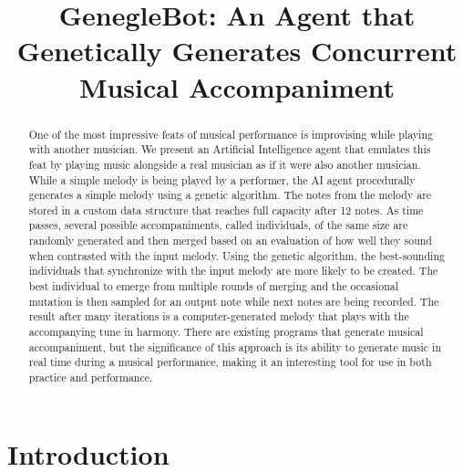 \documentclass[conference]{IEEEtran}
\begin{document}
\title{GenegleBot: An Agent that Genetically Generates Concurrent Musical Accompaniment
	\\
	{\footnotesize }
}

\author{
	\and
}

\maketitle

\begin{abstract}
	One of the most impressive feats of musical performance is improvising while playing with another musician. We present an Artificial Intelligence agent that emulates this feat by playing music alongside a real musician as if it were also another musician.
	While a simple melody is being played by a performer, the AI agent procedurally generates a simple melody using a genetic algorithm. The notes from the melody are stored in a custom data structure that reaches full capacity after 12 notes. As time passes, several possible accompaniments, called individuals, of the same size are randomly generated and then merged based on an evaluation of how well they sound when contrasted with the input melody. Using the genetic algorithm, the best-sounding individuals that synchronize with the input melody are more likely to be created. The best individual to emerge from multiple rounds of merging and the occasional mutation is then sampled for an output note while next notes are being recorded. The result after many iterations is a computer-generated melody that plays with the accompanying tune in harmony.
	There are existing programs that generate musical accompaniment, but the significance of this approach is its ability to generate music in real time during a musical performance, making it an interesting tool for use in both practice and performance.
	
\end{abstract}

\section{Introduction}
\end{document}
